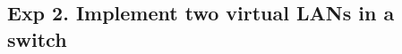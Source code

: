 \documentclass[compilation.tex]{subfiles}
\begin{document}
	
	\subsection[Implement two virtual LANs in a switch]{Exp 2. Implement two virtual LANs in a switch}
	\label{exp:2}
	
\end{document}

